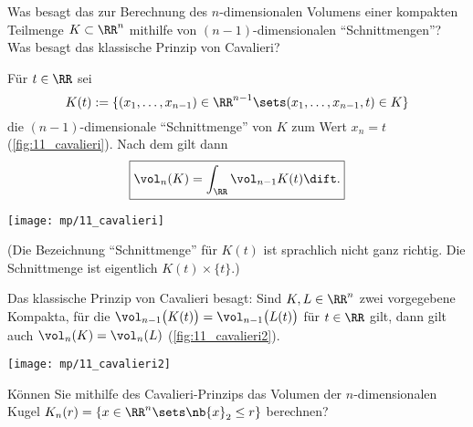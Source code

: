 \begin{frage}
  Was besagt das  zur Berechnung des $n$-dimensionalen 
  Volumens einer kompakten Teilmenge $K\subset\RR^n$ mithilfe 
  von $(n-1)$-dimensionalen "`Schnittmengen"'? 
  Was besagt das klassische Prinzip von Cavalieri?
\end{frage}


\begin{antwort}[]%
  \Ant F\"ur $t\in \RR$ sei 
  \[
  K(t):= \{ (x_1,\ldots,x_{n-1}) \in \RR^{n-1} \sets 
  (x_1,\ldots,x_{n-1}, t ) \in K\} 
  \]
  die $(n-1)$-dimensionale "`Schnittmenge"' von $K$ zum Wert  
  $x_n=t$ (\sieheAbbildung\ref{fig:11_cavalieri}). 
  Nach dem  gilt dann 
  \[
  \boxed{
    \vol_n( K ) = \int_\RR \vol_{n-1} K(t) \dift.}
  \]

  \begin{center}
    \texttt{[image: mp/11\_cavalieri]}
    \label{fig:11_cavalieri}
  \end{center}

  (Die Bezeichnung "`Schnittmenge"' f\"ur $K(t)$ ist 
  sprachlich nicht ganz richtig. Die 
  Schnittmenge ist eigentlich $K(t) \times \{ t \}$.)

  Das klassische Prinzip von Cavalieri besagt: Sind $K,L\in\RR^n$ zwei 
  vorgegebene Kompakta, f\"ur die 
  $\vol_{n-1}\big( K(t) \big)=\vol_{n-1} \big( L(t) \big)$ f\"ur 
   $t\in\RR$ gilt, dann gilt auch $\vol_n(K)=\vol_n(L)$ 
  (\sieheAbbildung\ref{fig:11_cavalieri2}). 
  \AntEnd

  \begin{center}
    \texttt{[image: mp/11\_cavalieri2]}
    \label{fig:11_cavalieri2}
  \end{center}
\end{antwort}

\begin{frage}\label{11_kappa}
  K\"onnen Sie mithilfe des Cavalieri-Prinzips das Volumen 
  der $n$-dimensionalen Kugel 
  $K_n (r) = \{ x\in\RR^n \sets \nb{ x }_2 \le r\} $ berechnen?
\end{frage}

